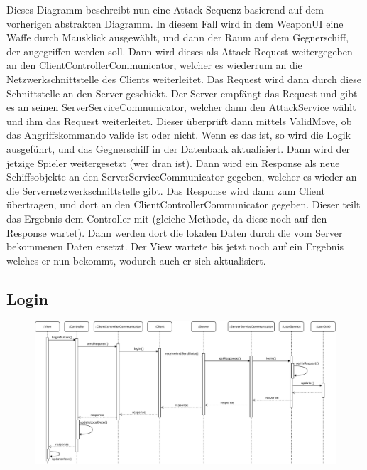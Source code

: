 \documentclass[fontsize=12pt,paper=a4,twoside]{scrartcl}
\begin{document}
Dieses Diagramm beschreibt nun eine Attack-Sequenz basierend auf dem vorherigen abstrakten Diagramm. In diesem Fall wird in dem WeaponUI eine Waffe durch Mausklick ausgewählt, und dann der Raum auf dem Gegnerschiff, der angegriffen werden soll. Dann wird dieses als Attack-Request weitergegeben an den ClientControllerCommunicator, welcher es wiederrum an die Netzwerkschnittstelle des Clients weiterleitet. Das Request wird dann durch diese Schnittstelle an den Server geschickt. Der Server empfängt das Request und gibt es an seinen ServerServiceCommunicator, welcher dann den AttackService wählt und ihm das Request weiterleitet. Dieser überprüft dann mittels ValidMove, ob das Angriffskommando valide ist oder nicht. Wenn es das ist, so wird die Logik ausgeführt, und das Gegnerschiff in der Datenbank aktualisiert. Dann wird der jetzige Spieler weitergesetzt (wer dran ist). Dann wird ein Response als neue Schiffsobjekte an den ServerServiceCommunicator gegeben, welcher es wieder an die Servernetzwerkschnittstelle gibt. Das Response wird dann zum Client übertragen, und dort an den ClientControllerCommunicator gegeben. Dieser teilt das Ergebnis dem Controller mit (gleiche Methode, da diese noch auf den Response wartet). Dann werden dort die lokalen Daten durch die vom Server bekommenen Daten ersetzt. Der View wartete bis jetzt noch auf ein Ergebnis welches er nun bekommt, wodurch auch er sich aktualisiert.


\subsection{Login}

\begin{figure}[H]
\begin{center}
  \includegraphics[width=\linewidth]{UML/Sequenz-Client-login.pdf}
\end{center}
\end{figure}
\end{document}
